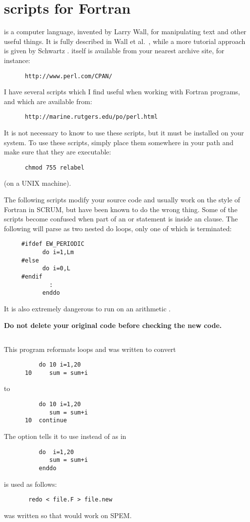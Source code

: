 \section{ scripts for Fortran}
\label{Perl}
 is a computer language, invented by Larry Wall, for
manipulating text and other useful things.  It is fully described in
Wall et al.\ \cite{perl1}, while a more tutorial approach is given
by Schwartz \cite{perl2}.   itself is available from your
nearest  archive site, for instance:
\begin{verbatim}
      http://www.perl.com/CPAN/
\end{verbatim}

I have several  scripts which I find useful when working
with Fortran programs, and which are available from:
\begin{verbatim}
      http://marine.rutgers.edu/po/perl.html
\end{verbatim}
It is not necessary to know  to
use these scripts, but it must be installed on your system.  To use
these scripts, simply place them somewhere in your path and make sure
that they are executable:
\begin{verbatim}
      chmod 755 relabel
\end{verbatim}
(on a UNIX machine).

The following scripts modify your source code and usually work on the
style of Fortran in SCRUM, but have been known to do the wrong thing.
Some of the scripts become confused when part of an  or
 statement is inside an  clause.  The following
will parse as two nested do loops, only one of which is terminated:
\begin{verbatim}
     #ifdef EW_PERIODIC
           do i=1,Lm
     #else
           do i=0,L
     #endif
             :
           enddo
\end{verbatim}
It is also extremely dangerous to run  on an arithmetic
.

{\bf Do not delete your original code before checking the new code.}

\subsection{}
This program reformats  loops and was written to convert
\begin{verbatim}
          do 10 i=1,20
      10     sum = sum+i
\end{verbatim}
to
\begin{verbatim}
          do 10 i=1,20
             sum = sum+i
      10  continue
\end{verbatim}
The  option tells it to use  instead of
 as in
\begin{verbatim}
          do  i=1,20
             sum = sum+i
          enddo
\end{verbatim}
 is used as follows:
\begin{verbatim}
       redo < file.F > file.new
\end{verbatim}
 was written so that  would work on SPEM.

